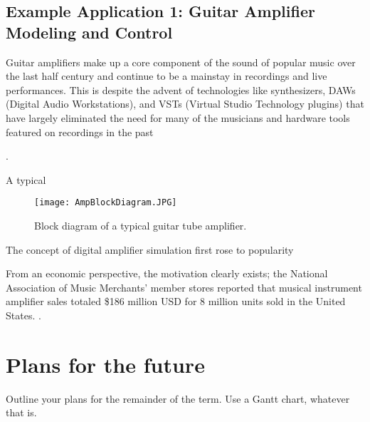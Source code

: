 \documentclass[12pt,letterpaper]{article}
\begin{document}
\subsection{Example Application 1: Guitar Amplifier Modeling and Control}
Guitar amplifiers  make up a core component of the sound of popular music over the last half century and continue to be a mainstay in recordings and live performances. This is despite the advent of technologies like synthesizers, DAWs (Digital Audio Workstations),  and VSTs (Virtual Studio Technology plugins) that have largely eliminated the need for many of the musicians and hardware tools featured on recordings in the past

\cite{specialIntroGuitar}.

A typical

\begin{figure}[ht!]
\centering
\texttt{[image: AmpBlockDiagram.JPG]}
\caption{Block diagram of a typical guitar tube amplifier. \label{overflow}}
\end{figure}

The concept of digital amplifier simulation first rose to popularity
\par
From an economic perspective, the motivation clearly exists; the National Association of Music Merchants' member stores reported that musical instrument amplifier sales totaled \$186 million USD for 8 million units sold in the United States. \cite{NAMMReport}.

\section{Plans for the future}

Outline your plans for the remainder of the term.  Use a Gantt chart, whatever that is.

{}

\end{document}
